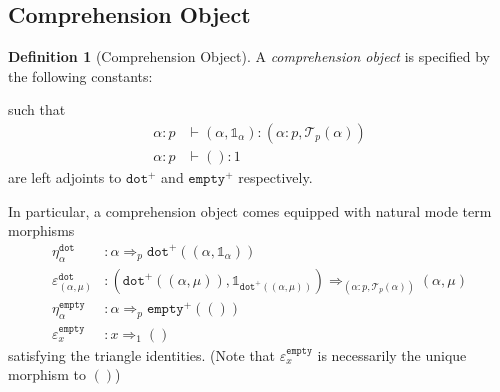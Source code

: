 \documentclass[10pt]{article}
\theoremstyle{definition}
\newtheorem{definition}{Definition}
\newcommand{\yields}{\vdash}
\newcommand{\tcell}{\Rightarrow}
\newcommand{\type}{\,\,\mathsf{mode}}
\newcommand{\sigmacl}[3]{\ensuremath{(#1{:}#2,#3)}}
\newcommand\TypeTwo[4]{\ensuremath{#1 \vdash #2 :  #3 \tcell #4}}
\newcommand\TrPlus[2]{\ensuremath{{#1}^+(#2)}}
\newcommand\El[2]{\mathcal{T}_{#1}(#2)}
\newcommand{\tdot}{\ensuremath{\mathtt{dot}}}
\newcommand{\tempty}{\ensuremath{\mathtt{empty}}}
\newcommand\One{\ensuremath{\mathds{1}}}
\begin{document}
\subsection{Comprehension Object}

\begin{definition}[Comprehension Object]\label{def:comprehension-object}
  A \emph{comprehension object} is specified by the following
  constants:
  such that
\begin{align*}
\alpha : p &\yields (\alpha, \One_\alpha) : \sigmacl{\alpha}{p}{\El{p}{\alpha}} \\
\alpha : p &\yields () : 1
\end{align*}
are left adjoints to $\tdot^+$ and $\tempty^+$ respectively.
\end{definition}

In particular, a comprehension object comes equipped with natural mode term morphisms
\begin{align*}
\eta^\tdot_\alpha {}&: \alpha \tcell_p \TrPlus{\tdot}{(\alpha, \One_\alpha)} \\
\varepsilon^\tdot_{(\alpha, \mu)} {}&: (\TrPlus{\tdot}{(\alpha, \mu)}, \One_{\TrPlus{\tdot}{(\alpha, \mu)}}) \tcell_{\sigmacl{\alpha}{p}{\El{p}{\alpha}}} (\alpha, \mu) \\
\eta^\tempty_\alpha {}&: \alpha \tcell_p \TrPlus{\tempty}{()} \\
\varepsilon^\tempty_{x} {}&: x \tcell_1 ()
\end{align*}
satisfying the triangle identities. (Note that $\varepsilon^\tempty_x$ is necessarily the unique morphism to $()$)
\end{document}
